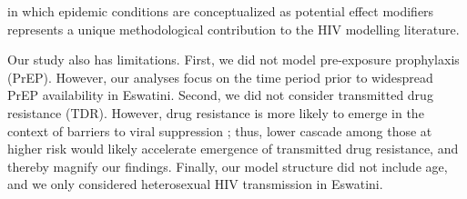 in which epidemic conditions are conceptualized as potential effect modifiers
represents a unique methodological contribution to the HIV modelling literature.
\par
Our study also has limitations.
First, we did not model pre-exposure prophylaxis (PrEP).
However, our analyses focus on the time period
prior to widespread PrEP availability in Eswatini.
Second, we did not consider transmitted drug resistance (TDR).
However, drug resistance is more likely to emerge
in the context of barriers to viral suppression \cite{Pham2014};
thus, lower cascade among those at higher risk
would likely accelerate emergence of transmitted drug resistance,
and thereby magnify our findings.
Finally, our model structure did not include age,
and we only considered heterosexual HIV transmission in Eswatini.
